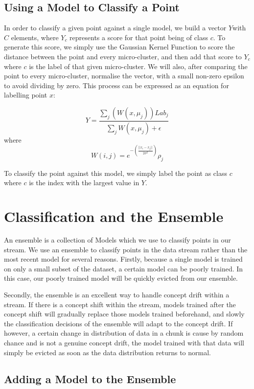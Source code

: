 \documentclass[12pt,a4paper,oneside]{report}
\begin{document}
\subsection{Using a Model to Classify a Point}

In order to classify a given point against a single model, we build a vector $Y$with $C$ elements, where $Y_c$ represents a score for that point being of class $c$. To generate this score, we simply use the Gaussian Kernel Function to score the distance between the point and every micro-cluster, and then add that score to $Y_c$ where $c$ is the label of that given micro-cluster. We will also, after comparing the point to every micro-cluster, normalise the vector, with a small non-zero epsilon to avoid dividing by zero. This process can be expressed as an equation for labelling point $x$:

\[ Y = \frac{\sum_j(W(x,\mu_j))Lab_j}{\sum_j{W(x,\mu_j)} + \epsilon} \]
where
\[W(i,j) = e^{-(\frac{||x_i-x_j||}{2\sigma^2})}\rho_j\]

To classify the point against this model, we simply label the point as class $c$ where $c$ is the index with the largest value in $Y$.
\section{Classification and the Ensemble}
 
An ensemble is a collection of Models which we use to classify points in our stream. We use an ensemble to classify points in the data stream rather than the most recent model for several reasons. Firstly, because a single model is trained on only a small subset of the dataset, a certain model can be poorly trained. In this case, our poorly trained model will be quickly evicted from our ensemble. 

Secondly, the ensemble is an excellent way to handle concept drift within a stream. If there is a concept shift within the stream, models trained after the concept shift will gradually replace those models trained beforehand, and slowly the classification decisions of the ensemble will adapt to the concept drift. If however, a certain change in distribution of data in a chunk is cause by random chance and is not a genuine concept drift, the model trained with that data will simply be evicted as soon as the data distribution returns to normal. 

\subsection{Adding a Model to the Ensemble}
\end{document}
